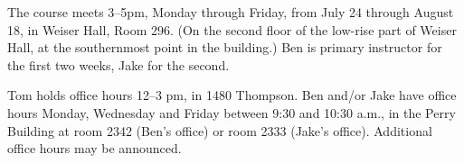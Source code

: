 The course meets 3--5pm, Monday through Friday, from July 24 through
August 18, in Weiser Hall, Room 296. (On the second floor of the
low-rise part of Weiser Hall, at the southernmost point in the
building.)  Ben is primary instructor for the first two weeks, Jake
for the second.

Tom holds office hours 12--3 pm, in 1480 Thompson. Ben and/or Jake
have office hours Monday, Wednesday and Friday between 9:30 and 10:30
a.m., in the Perry Building at room 2342 (Ben's office) or room 2333
(Jake's office).  Additional office hours may be announced.
